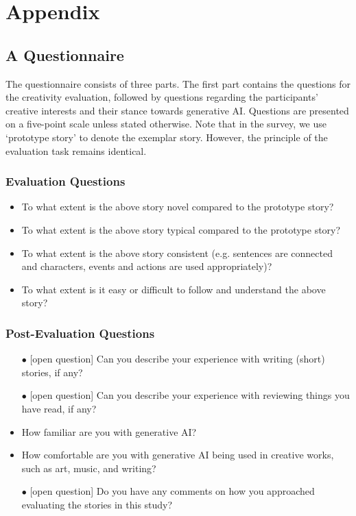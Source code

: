 \documentclass[a4paper]{article}
\begin{document}
\section{Appendix}

\subsection{A Questionnaire}\label{app:questionnaire}
The questionnaire consists of three parts. The first part contains the questions for the creativity evaluation, followed by questions regarding the participants' creative interests and their stance towards generative AI.
Questions are presented on a five-point scale unless stated otherwise.
Note that in the survey, we use `prototype story' to denote the exemplar story. However, the principle of the evaluation task remains identical.

\subsubsection{Evaluation Questions}
\begin{itemize}
    \item To what extent is the above story novel compared to the prototype story?
    \item To what extent is the above story typical compared to the prototype story?
    \item To what extent is the above story consistent (e.g. sentences are connected and characters, events and actions are used appropriately)?
    \item To what extent is it easy or difficult to follow and understand the above story?
\end{itemize}

\subsubsection{Post-Evaluation Questions}
\begin{itemize}
    \item[\tiny$\bullet$] [open question] Can you describe your experience with writing (short) stories, if any?
    \item[\tiny$\bullet$] [open question] Can you describe your experience with reviewing things you have read, if any?
    \item How familiar are you with generative AI?
    \item How comfortable are you with generative AI being used in creative works, such as art, music,
and writing?
    \item[\tiny$\bullet$] [open question] Do you have any comments on how you approached evaluating the stories in this study?
\end{itemize}
\end{document}

